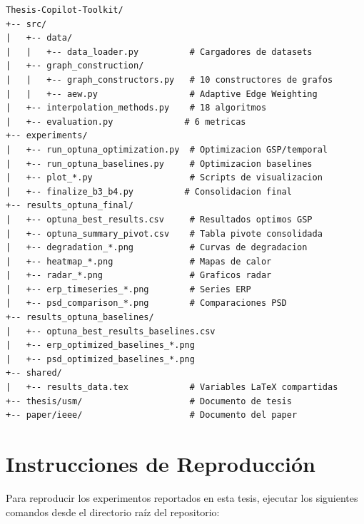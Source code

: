 \begin{verbatim}
Thesis-Copilot-Toolkit/
+-- src/
|   +-- data/
|   |   +-- data_loader.py          # Cargadores de datasets
|   +-- graph_construction/
|   |   +-- graph_constructors.py   # 10 constructores de grafos
|   |   +-- aew.py                  # Adaptive Edge Weighting
|   +-- interpolation_methods.py    # 18 algoritmos
|   +-- evaluation.py              # 6 metricas
+-- experiments/
|   +-- run_optuna_optimization.py  # Optimizacion GSP/temporal
|   +-- run_optuna_baselines.py     # Optimizacion baselines
|   +-- plot_*.py                   # Scripts de visualizacion
|   +-- finalize_b3_b4.py          # Consolidacion final
+-- results_optuna_final/
|   +-- optuna_best_results.csv     # Resultados optimos GSP
|   +-- optuna_summary_pivot.csv    # Tabla pivote consolidada
|   +-- degradation_*.png           # Curvas de degradacion
|   +-- heatmap_*.png               # Mapas de calor
|   +-- radar_*.png                 # Graficos radar
|   +-- erp_timeseries_*.png        # Series ERP
|   +-- psd_comparison_*.png        # Comparaciones PSD
+-- results_optuna_baselines/
|   +-- optuna_best_results_baselines.csv
|   +-- erp_optimized_baselines_*.png
|   +-- psd_optimized_baselines_*.png
+-- shared/
|   +-- results_data.tex            # Variables LaTeX compartidas
+-- thesis/usm/                     # Documento de tesis
+-- paper/ieee/                     # Documento del paper
\end{verbatim}

\chapter{Instrucciones de Reproducción}

Para reproducir los experimentos reportados en esta tesis, ejecutar los siguientes comandos desde el directorio raíz del repositorio:

